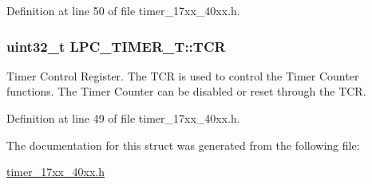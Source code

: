 Definition at line 50 of file timer\+\_\+17xx\+\_\+40xx.\+h.

\subsubsection[{\texorpdfstring{T\+CR}{TCR}}]{ uint32\+\_\+t L\+P\+C\+\_\+\+T\+I\+M\+E\+R\+\_\+\+T\+::\+T\+CR}\hypertarget{structLPC__TIMER__T_ab6f7507a9fa9ac19e6ffb35f766027bb}{}\label{structLPC__TIMER__T_ab6f7507a9fa9ac19e6ffb35f766027bb}
Timer Control Register. The T\+CR is used to control the Timer Counter functions. The Timer Counter can be disabled or reset through the T\+CR. 

Definition at line 49 of file timer\+\_\+17xx\+\_\+40xx.\+h.



The documentation for this struct was generated from the following file\+:\begin{DoxyCompactItemize}
\item 
\hyperlink{timer__17xx__40xx_8h}{timer\+\_\+17xx\+\_\+40xx.\+h}\end{DoxyCompactItemize}
